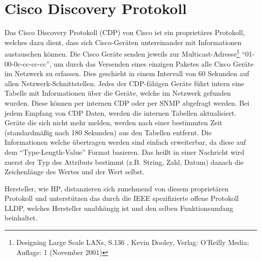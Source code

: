 \section{Cisco Discovery Protokoll}
\label{sec:cdp}

Das Cisco Discovery Protokoll (CDP) von Cisco ist ein proprietäres Protokoll, welches dazu dient, dass sich Cisco-Geräten untereinander mit Informationen austauschen können.
Die Cisco Geräte senden jeweils zur Multicast-Adresse\footnote{Designing Large Scale LANs, S.136 , Kevin Dooley, Verlag: O'Reilly Media; Auflage: 1 (November 2001)} “01-00-0c-cc-cc-cc”, um durch das Versenden eines einzigen Paketes alle Cisco Geräte im Netzwerk zu erfassen.
Dies geschieht in einem Intervall von 60 Sekunden auf allen Netzwerk-Schnittstellen.
Jedes der CDP-fähigen Geräte führt intern eine Tabelle mit Informationen über die Geräte, welche im Netzwerk gefunden wurden.
Diese können per internen CDP oder per SNMP abgefragt werden.
Bei jedem Empfang von CDP Daten, werden die internen Tabellen aktualisiert.
Geräte die sich nicht mehr melden, werden nach einer bestimmten Zeit (standardmäßig nach 180 Sekunden) aus den Tabellen entfernt.
Die Informationen welche übertragen werden sind einfach erweiterbar, da diese auf dem “Type-Length-Value” Format basieren.
Das heißt in einer Nachricht wird zuerst der Typ des Attributs bestimmt (z.B. String, Zahl, Datum) danach die Zeichenlänge des Wertes und der Wert selbst.

Hersteller, wie HP, distanzieren sich zunehmend von diesem proprietären Protokoll und unterstützen das durch die IEEE spezifizierte offene Protokoll LLDP, welches Hersteller unabhängig ist und den selben Funktionsumfang beinhaltet.